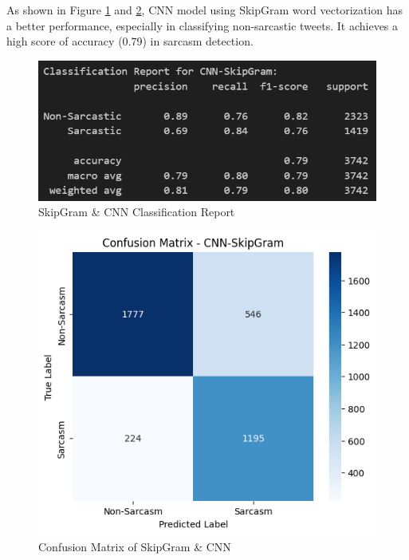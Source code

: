 \documentclass[11pt]{article}
\begin{document}
As shown in Figure \ref{fig:sgcnncr} and \ref{fig:sgcnncm}, CNN model using SkipGram word vectorization has a better performance, especially in classifying non-sarcastic tweets. It achieves a high score of accuracy (0.79) in sarcasm detection.
\begin{figure}[htbp]
    \centering
    \includegraphics[width=.8\linewidth]{pic/CNN-Skipgram-Report.png}
    \caption{SkipGram \& CNN Classification Report}
    \label{fig:sgcnncr}
\end{figure}
\begin{figure}[htbp]
    \centering
    \includegraphics[width=.8\linewidth]{pic/CNN-Skipgram-Matrix.png}
    \caption{Confusion Matrix of SkipGram \& CNN}
    \label{fig:sgcnncm}
\end{figure}
\end{document}
